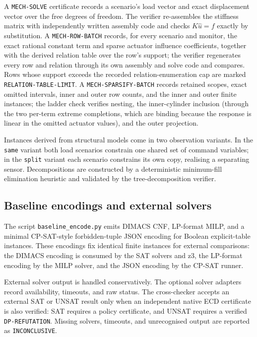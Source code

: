 A \texttt{MECH-SOLVE} certificate records a scenario's load vector and exact
displacement vector over the free degrees of freedom. The verifier re-assembles
the stiffness matrix with independently written assembly code and checks
$K\widehat u = f$ exactly by substitution. A \texttt{MECH-ROW-BATCH} records,
for every scenario and monitor, the exact rational constant term and sparse
actuator influence coefficients, together with the derived relation table over
the row's support; the verifier regenerates every row and relation through its
own assembly and solve code and compares. Rows whose support exceeds the
recorded relation-enumeration cap are marked
\texttt{RELATION-TABLE-LIMIT}. A \texttt{MECH-SPARSIFY-BATCH} records retained
scopes, exact omitted intervals, inner and outer row counts, and the inner and
outer finite instances; the ladder check verifies nesting, the inner-cylinder
inclusion (through the two per-term extreme completions, which are binding
because the response is linear in the omitted actuator values), and the outer
projection.

Instances derived from structural models come in two observation variants. In
the \texttt{same} variant both load scenarios constrain one shared set of
command variables; in the \texttt{split} variant each scenario constrains its
own copy, realising a separating sensor. Decompositions are constructed by a
deterministic minimum-fill elimination heuristic and validated by the
tree-decomposition verifier.

\subsection{Baseline encodings and external solvers}

The script \texttt{baseline\_encode.py} emits DIMACS CNF, LP-format MILP, and a
minimal CP-SAT-style forbidden-tuple JSON encoding for Boolean explicit-table
instances. These encodings fix identical finite instances for external
comparisons: the DIMACS encoding is consumed by the SAT solvers and z3, the
LP-format encoding by the MILP solver, and the JSON encoding by the CP-SAT
runner.

External solver output is handled conservatively. The optional solver adapters
record availability, timeouts, and raw status. The cross-checker accepts an
external SAT or UNSAT result only when an independent native ECD certificate is
also verified: SAT requires a policy certificate, and UNSAT requires a verified
\texttt{DP-REFUTATION}. Missing solvers, timeouts, and unrecognised output are
reported as \texttt{INCONCLUSIVE}.

